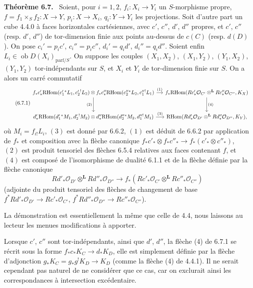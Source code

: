 \documentclass[11pt]{article}
\providecommand{\cO}{\mathcal{O}}
\newenvironment{statement}[1]{\par\medskip\noindent\textbf{#1.}\ }{\par\medskip}
\providecommand{\RHom}{\mathrm{RHom}}
\providecommand{\RHom}{\mathrm{RHom}}
\providecommand{\RHom}{\mathrm R\mathcal{H}om}
\providecommand{\RHom}{\mathrm{RHom}}
\begin{document}
\begin{statement}{Théorème 6.7}
Soient, pour $i=1,2$, $f_i:X_i\to Y_i$ un $S$-morphisme propre, $f=f_1\times_Sf_2:X\to Y$, $p_i:X\to X_i$, $q_i:Y\to Y_i$ les projections. Soit d'autre part un cube 4.4.0 à faces horizontales cartésiennes, avec $c'$, $c''$, $d'$, $d''$ propres, et $c'$, $c''$ (resp. $d'$, $d''$) de tor-dimension finie aux points au-dessus de $c(C)$ (resp. $d(D)$). On pose $c_i'=p_ic'$, $c_i''=p_ic''$, $d_i'=q_id'$, $d_i''=q_id''$. Soient enfin $L_i\in\operatorname{ob}D(X_i)_{\mathrm{parf}/S}$. On suppose les couples $(X_1,X_2)$, $(X_1,Y_2)$, $(Y_1,X_2)$, $(Y_1,Y_2)$ tor-indépendants sur $S$, et $X_i$ et $Y_i$ de tor-dimension finie sur $S$. On a alors un carré commutatif
\begin{equation}
\tag{6.7.1}
\begin{tikzcd}[column sep=small,row sep=large]
f_*c'_*\RHom(c_1'{}^*L_1,c_2'{}^!L_2)\otimes f_*c''_*\RHom(c_2''{}^*L_2,c_1''{}^!L_1) \arrow[r,"(1)"] \arrow[d,"(2)"']
& f_*\RHom(Rc'_*\cO_{C'}\otimes^{\mathbf L}Rc''_*\cO_{C''},K_X) \arrow[d,"(4)"] \\
d'_*\RHom(d_1'{}^*M_1,d_2'{}^!M_2)\otimes d''_*\RHom(d_2''{}^*M_2,d_1''{}^!M_1) \arrow[r,"(3)"]
& \RHom(Rd'_*\cO_{D'}\otimes^{\mathbf L}Rd''_*\cO_{D''},K_Y),
\end{tikzcd}
\end{equation}
où $M_i=f_{i!}L_i$, $(3)$ est donné par 6.6.2, $(1)$ est déduit de 6.6.2 par application de $f_*$ et composition avec la flèche canonique $f_*c'_*\otimes f_*c''_*\to f_*(c'_*\otimes c''_*)$, $(2)$ est produit tensoriel des flèches 6.5.4 relatives aux faces contenant $f$, et $(4)$ est composé de l'isomorphisme de dualité 6.1.1 et de la flèche définie par la flèche canonique
\[
Rd'_*\cO_{D'}\otimes^{\mathbf L}Rd''_*\cO_{D''}\longrightarrow f_*(Rc'_*\cO_{C'}\otimes^{\mathbf L}Rc''_*\cO_{C''})
\]
(adjointe du produit tensoriel des flèches de changement de base $f^*Rd'_*\cO_{D'}\to Rc'_*\cO_{C'}$, $f^*Rd''_*\cO_{D''}\to Rc''_*\cO_{C''}$).
\end{statement}

La démonstration est essentiellement la même que celle de 4.4, nous laissons au lecteur les menues modifications à apporter.

Lorsque $c'$, $c''$ sont tor-indépendants, ainsi que $d'$, $d''$, la flèche (4) de 6.7.1 se récrit sous la forme $f_*c_*K_C\to d_*K_D$, elle est simplement définie par la flèche d'adjonction $g_*K_C=g_*g^!K_D\to K_D$ (comme la flèche (4) de 4.4.1). Il ne serait cependant pas naturel de ne considérer que ce cas, car on exclurait ainsi les correspondances à intersection excédentaire.
\end{document}
